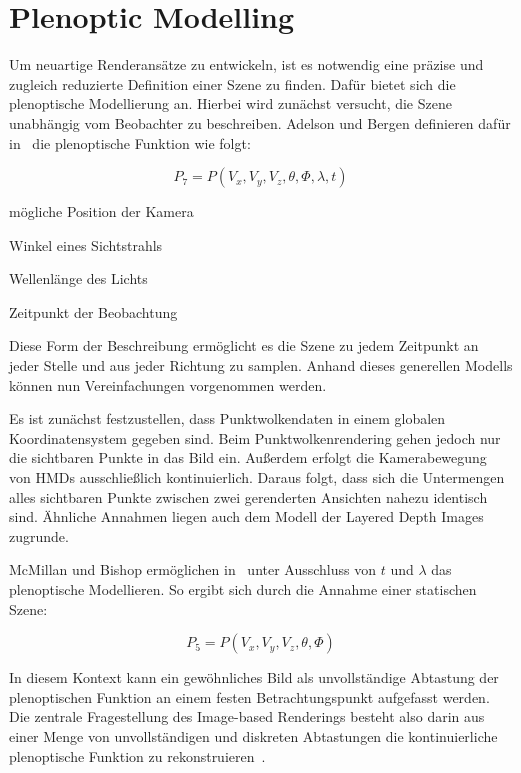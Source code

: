 \documentclass[hyperref, beleg, german]{cgvpub}
\begin{document}
\section{Plenoptic Modelling}

Um neuartige Renderansätze zu entwickeln, ist es notwendig eine präzise und
zugleich reduzierte Definition einer Szene zu finden. Dafür bietet sich die
plenoptische Modellierung an. Hierbei wird zunächst versucht, die Szene
unabhängig vom Beobachter zu beschreiben. Adelson und Bergen definieren dafür
in~\cite{adelson1991plenoptic} die plenoptische Funktion wie folgt:

\begin{equation}
	P_7 = P(V_x, V_y, V_z, \theta, \Phi, \lambda, t)
\end{equation}

\begin{description}[style=sameline]
	\item[\( V_x, V_y, V_z \)] mögliche Position der Kamera
	\item[\( \theta, \Phi \)] Winkel eines Sichtstrahls
	\item[\( \lambda \)] Wellenlänge des Lichts
	\item[\( t \)] Zeitpunkt der Beobachtung
\end{description}

Diese Form der Beschreibung ermöglicht es die Szene zu jedem Zeitpunkt an jeder
Stelle und aus jeder Richtung zu samplen. Anhand dieses generellen Modells
können nun Vereinfachungen vorgenommen werden.

Es ist zunächst festzustellen, dass Punktwolkendaten in einem globalen
Koordinatensystem gegeben sind. Beim Punktwolkenrendering gehen jedoch nur die
sichtbaren Punkte in das Bild ein. Außerdem erfolgt die Kamerabewegung von HMDs
ausschließlich kontinuierlich. Daraus folgt, dass sich die Untermengen alles
sichtbaren Punkte zwischen zwei gerenderten Ansichten nahezu identisch sind.
Ähnliche Annahmen liegen auch dem Modell der Layered Depth Images zugrunde.

McMillan und Bishop ermöglichen in~\cite{mcmillan1995plenoptic} unter
Ausschluss von \( t \) und \( \lambda \) das plenoptische Modellieren. So
ergibt sich durch die Annahme einer statischen Szene:

\begin{equation}
	P_5 = P(V_x, V_y, V_z, \theta, \Phi)
\end{equation}

In diesem Kontext kann ein gewöhnliches Bild als unvollständige Abtastung der
plenoptischen Funktion an einem festen Betrachtungspunkt aufgefasst werden. Die
zentrale Fragestellung des Image-based Renderings besteht also darin aus einer
Menge von unvollständigen und diskreten Abtastungen die kontinuierliche
plenoptische Funktion zu rekonstruieren~\cite{mcmillan1995plenoptic}.
\end{document}
